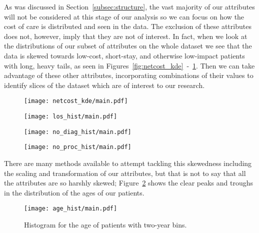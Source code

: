 As was discussed in Section~\ref{subsec:structure}, the vast majority of our
attributes will not be considered at this stage of our analysis so we can focus
on how the cost of care is distributed and seen in the data. The exclusion of
these attributes does not, however, imply that they are not of interest. In
fact, when we look at the distributions of our subset of attributes on the whole
dataset we see that the data is skewed towards low-cost, short-stay, and
otherwise low-impact patients with long, heavy tails, as seen in
Figures~\ref{fig:netcost_kde}~\--~\ref{fig:no_proc_hist}. Then we can take
advantage of these other attributes, incorporating combinations of their values
to identify slices of the dataset which are of interest to our research.

\graphicspath{{./img/general/}}

\begin{figure}[h]
    \centering
    \begin{minipage}{.5\textwidth}
        \centering
        \texttt{[image: netcost\_kde/main.pdf]}
        \label{fig:netcost_kde}
    \end{minipage}%
    \begin{minipage}{.5\textwidth}
        \centering
        \texttt{[image: los\_hist/main.pdf]}
        \label{fig:los_hist}
    \end{minipage}

    \begin{minipage}{.5\textwidth}
        \centering
        \texttt{[image: no\_diag\_hist/main.pdf]}
        \label{fig:no_diag_hist}
    \end{minipage}%
    \begin{minipage}{.5\textwidth}
        \centering
        \texttt{[image: no\_proc\_hist/main.pdf]}
        \label{fig:no_proc_hist}
    \end{minipage}
\end{figure}

There are many methods available to attempt tackling this skewedness including
the scaling and transformation of our attributes, but that is not to say that
all the attributes are so harshly skewed; Figure~\ref{fig:age_hist} shows the
clear peaks and troughs in the distribution of the ages of our patients.

\begin{figure}[h]
    \centering
    \texttt{[image: age\_hist/main.pdf]}
    \caption{Histogram for the age of patients with two-year
    bins.}\label{fig:age_hist}
\end{figure}
